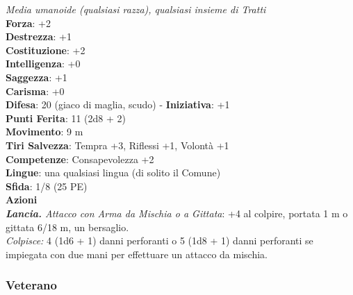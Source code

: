 \begin{multicols}{2}
\emph{Media umanoide (qualsiasi razza), qualsiasi insieme di Tratti}\\
\textbf{Forza}: +2\\
\textbf{Destrezza}: +1\\
\textbf{Costituzione}: +2\\
\textbf{Intelligenza}: +0\\
\textbf{Saggezza}: +1\\
\textbf{Carisma}: +0\\
\textbf{Difesa}: 20 (giaco di maglia, scudo) - \textbf{Iniziativa}: +1\\
\textbf{Punti Ferita}: 11 (2d8 + 2)\\
\textbf{Movimento}: 9 m\\
\textbf{Tiri Salvezza}: Tempra +3, Riflessi +1, Volontà +1 \\
\textbf{Competenze}: Consapevolezza +2\\
\textbf{Lingue}: una qualsiasi lingua (di solito il Comune)\\
\textbf{Sfida}: 1/8 (25 PE)\smallskip\\
\smallskip\textbf{Azioni}\\
\emph{\textbf{Lancia.} Attacco con Arma da Mischia o a Gittata}: +4 al colpire, portata 1 m o gittata 6/18 m, un bersaglio.\\
\emph{Colpisce:} 4 (1d6 + 1) danni perforanti o 5 (1d8 + 1) danni perforanti se impiegata con due mani per effettuare un attacco da mischia.\\

\subsubsection{Veterano}


\end{multicols}
